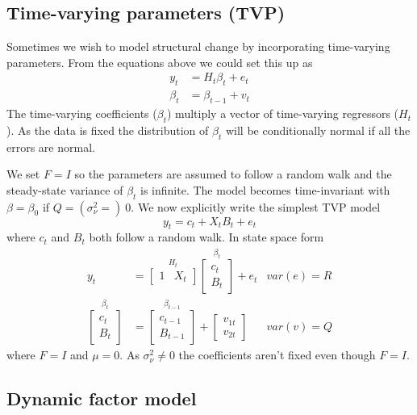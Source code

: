 \documentclass[
  letterpaper,
]{book}
\begin{document}
\hypertarget{time-varying-parameters-tvp}{%
\subsection{Time-varying parameters
(TVP)}\label{time-varying-parameters-tvp}}

Sometimes we wish to model structural change by incorporating
time-varying parameters. From the equations above we could set this up
as \begin{align*}
    y_t     &= H_t \beta_t + e_t \\
    \beta_t &= \beta_{t-1} + v_t
    \end{align*} The time-varying coefficients (\(\beta_t\)) multiply a
vector of time-varying regressors (\(H_t\)). As the data is fixed the
distribution of \(\beta_t\) will be conditionally normal if all the
errors are normal.

We set \(F=I\) so the parameters are assumed to follow a random walk and
the steady-state variance of \(\beta_t\) is infinite. The model becomes
time-invariant with \(\beta=\beta_0\) if \(Q = (\sigma_{\nu}^2=)\ 0\).
We now explicitly write the simplest TVP model \[
    y_t = c_t + X_t B_t + e_t
\] where \(c_t\) and \(B_t\) both follow a random walk. In state space
form \[
    \begin{align}
    y_t &= \overset{H_t} {\begin{bmatrix} 1 & X_t \end{bmatrix} } 
     \overset{\beta_t} {\begin{bmatrix} c_t \\ B_t \end{bmatrix} } + e_t & var(e) = R \\
     \overset{\beta_t} {\begin{bmatrix} c_t \\ B_t \end{bmatrix} } &= 
     \overset{\beta_{t-1}} {\begin{bmatrix} c_{t-1} \\  B_{t-1} \end{bmatrix}} 
     + \begin{bmatrix} v_{1t} \\ v_{2t} \end{bmatrix} & var(v) = Q 
    \end{align}
\] where \(F=I\) and \(\mu=0\). As \(\sigma_{\nu}^2 \neq 0\) the
coefficients aren't fixed even though \(F=I\).

\hypertarget{dynamic-factor-model}{%
\subsection{Dynamic factor model}\label{dynamic-factor-model}}
\end{document}
